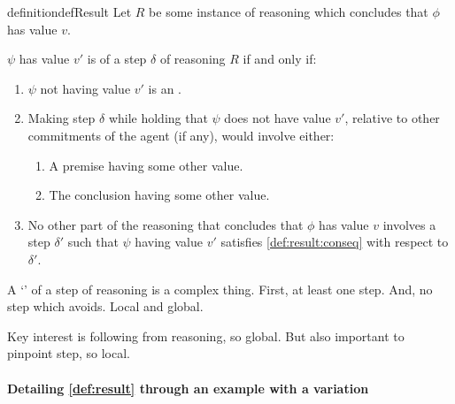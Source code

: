 \begin{note}
  \begin{restatable}{definition}{defResult}
    \label{def:result}
    Let \(R\) be some instance of reasoning which concludes that \(\phi\) has value \(v\).

    \(\psi\) has value \(v'\) is \emph{\result{}} of a step \(\delta\) of reasoning \(R\) if and only if:
    \begin{enumerate}[label=\arabic*., ref=\named{P:\arabic*}]
    \item
      \label{def:result:ep}
      \(\psi\) not having value \(v'\) is an \ep{}.
    \item
      \label{def:result:conseq}
      Making step \(\delta\) while holding that \(\psi\) does not have value \(v'\), relative to other commitments of the agent (if any), would involve either:
      \begin{enumerate}[label=\alph*., ref=\named{P:2\alph*}]
      \item
        \label{def:result:conseq:a}
        A premise having some other value.
      \item
        \label{def:result:conseq:c}
        The conclusion having some other value.
      \end{enumerate}
    \item
      \label{def:requ:persists}
      No other part of the reasoning that concludes that \(\phi\) has value \(v\) involves a step \(\delta'\) such that \(\psi\) having value \(v'\) satisfies \ref{def:result:conseq} with respect to \(\delta'\).
    \end{enumerate}
    \vspace{-\baselineskip}
  \end{restatable}
\end{note}

\begin{note}
  A `\result{}' of a step of reasoning is a complex thing.
  First, at least one step.
  And, no step which avoids.
  Local and global.

  Key interest is following from reasoning, so global.
  But also important to pinpoint step, so local.
\end{note}

\paragraph*{Detailing \autoref{def:result} through an example with a variation}

